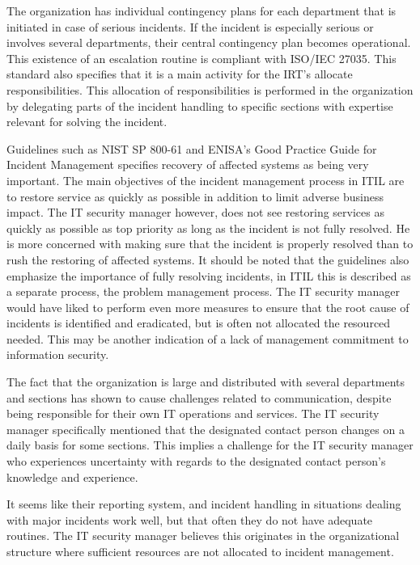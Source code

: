 The organization has individual contingency plans for each department that is initiated in case of serious incidents. If the incident is especially serious or involves several departments, their central contingency plan becomes operational. This existence of an escalation routine is compliant with ISO/IEC 27035. This standard also specifies that it is a main activity for the \ac{IRT}'s allocate responsibilities. This allocation of responsibilities is performed in the organization by delegating parts of the incident handling to specific sections with expertise relevant for solving the incident.

Guidelines such as NIST SP 800-61 and ENISA's Good Practice Guide for Incident Management specifies recovery of affected systems as being very important. The main objectives of the incident management process in ITIL are to restore service as quickly as possible in addition to limit adverse business impact. The IT security manager however, does not see restoring services as quickly as possible as top priority as long as the incident is not fully resolved. He is more concerned with making sure that the incident is properly resolved than to rush the restoring of affected systems. It should be noted that the guidelines also emphasize the importance of fully resolving incidents, in ITIL this is described as a separate process, the problem management process. The IT security manager would have liked to perform even more measures to ensure that the root cause of incidents is identified and eradicated, but is often not allocated the resourced needed. This may be another indication of a lack of management commitment to information security. 

The fact that the organization is large and distributed with several departments and sections has shown to cause challenges related to communication, despite being responsible for their own IT operations and services. The IT security manager specifically mentioned that the designated contact person changes on a daily basis for some sections. This implies a challenge for the IT security manager who experiences uncertainty with regards to the designated contact person's knowledge and experience.

It seems like their reporting system, and incident handling in situations dealing with major incidents work well, but that often they do not have adequate routines. The IT security manager believes this originates in the organizational structure where sufficient resources are not allocated to incident management. 

